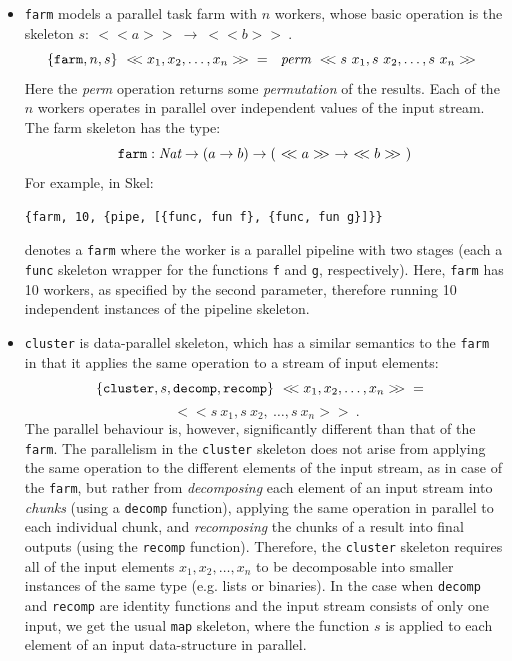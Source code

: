 \documentclass[final]{jfp1}
\newcommand{\farm}[0]{\texttt{farm}\xspace}
\newcommand{\stream}[1]{~<\!\!<#1>\!\!>~}
\begin{document}
\begin{itemize}
\item \texttt{farm} models a parallel task farm with $n$ workers, whose
  basic operation is the skeleton $s : \stream{a} \rightarrow \stream{b}$.  
$$\{ \texttt{farm},
  n, s \} \stream{x_1, x_2,\dots,x_n} \newline=~~ \emph{perm} \stream{ s~x_1, s~x_2,\dots, s~x_n }$$
  Here the \emph{perm} operation returns some
  \emph{permutation} of the results.  Each of the $n$ workers operates in
  parallel over independent values of the input stream.  %
  The farm skeleton has the type:
 $$\texttt{farm} : \emph{Nat} \rightarrow (a \rightarrow b) \rightarrow (\stream{a} \rightarrow \stream{b})$$
For example, in Skel:
\begin{lstlisting}
{farm, 10, {pipe, [{func, fun f}, {func, fun g}]}}
\end{lstlisting} 
denotes a \farm where the worker is a parallel pipeline with two stages
(each a \texttt{func} skeleton wrapper for the functions \texttt{f} and
\texttt{g}, respectively).
Here, \farm has 10 workers, as specified by the second parameter,
therefore running 10 independent instances of the pipeline skeleton.

\item \texttt{cluster} is data-parallel skeleton, which has a similar
  semantics to the \texttt{farm} in that it applies the same operation
  to a stream of input elements:
$$\{ \texttt{cluster}, s, \texttt{decomp}, \texttt{recomp} \}
\stream{ x_1, x_2,\dots,x_n } \newline=~~$$ $$
\stream{ s~x_1, s~x_2,~\dots,s~x_n }.$$
The parallel behaviour is, however, significantly different than that of the \texttt{farm}.
The parallelism in the \texttt{cluster} skeleton does not arise from applying the same operation to
the different elements of the input stream, as in case of the \texttt{farm}, but rather from
\emph{decomposing} each element of an input stream into \emph{chunks} (using a
\texttt{decomp} function), applying the
same operation in parallel to each individual chunk, and \emph{recomposing}
the chunks of a result into final outputs (using the \texttt{recomp} function).
Therefore, the \texttt{cluster}
skeleton requires all of the input elements $x_1,x_2,\dots,x_n$ to be decomposable
into smaller instances of the same type (e.g. lists or binaries). 
In the case when \texttt{decomp} and \texttt{recomp} are identity functions and the
input stream consists of only one input, we get the usual \texttt{map} skeleton, 
where the function $s$ is applied to each element of an input data-structure
in parallel.


\end{itemize}
\end{document}
